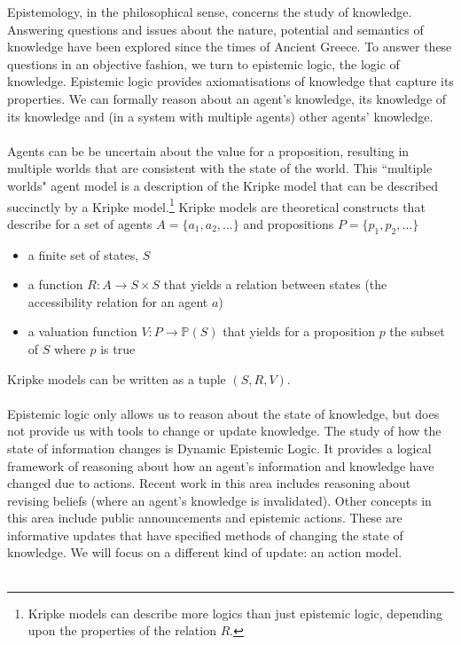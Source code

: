 Epistemology, in the philosophical sense, concerns the study of knowledge.
Answering questions and issues about the nature, potential and semantics of knowledge have been explored since the times of Ancient Greece.
To answer these questions in an objective fashion, we turn to epistemic logic, the logic of knowledge.
Epistemic logic provides axiomatisations of knowledge that capture its properties.
We can formally reason about an agent's knowledge, its knowledge of its knowledge and (in a system with multiple agents) other agents' knowledge. \cite{van2008dynamic}\\
\\
Agents can be be uncertain about the value for a proposition, resulting in multiple worlds that are consistent with the state of the world.
This ``multiple worlds" agent model is a description of the Kripke model that can be described succinctly by a Kripke model.\footnote{Kripke models can describe more logics than just epistemic logic, depending upon the properties of the relation $R$.}
Kripke models are theoretical constructs that describe for a set of agents $A = \{a_1, a_2, \ldots\}$ and propositions $P = \{p_1, p_2, \ldots \}$
\begin{itemize}
  \item a finite set of states, $S$
  \item a function $R: A \to S \times S$ that yields a relation between states (the accessibility relation for an agent $a$)
  \item a valuation function $V: P \to \mathbb{P}(S)$ that yields for a proposition $p$ the subset of $S$ where $p$ is true
\end{itemize}
Kripke models can be written as a tuple $(S, R, V)$.\\
\\
Epistemic logic only allows us to reason about the state of knowledge, but does not provide us with tools to change or update knowledge.
The study of how the state of information changes is Dynamic Epistemic Logic.
It provides a logical framework of reasoning about how an agent's information and knowledge have changed due to actions.
Recent work in this area includes reasoning about revising beliefs (where an agent's knowledge is invalidated).
Other concepts in this area include public announcements and epistemic actions.
These are informative updates that have specified methods of changing the state of knowledge.
We will focus on a different kind of update: an action model.\\
\\
